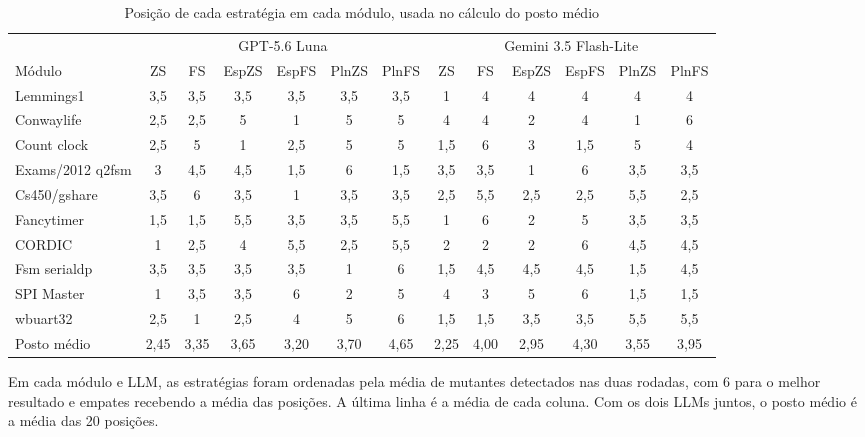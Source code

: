\begin{table}[htbp]
  \centering
  \caption{Posição de cada estratégia em cada módulo, usada no cálculo do posto médio}
  \label{tab:ap_postos}
  \scriptsize
  \setlength{\tabcolsep}{3pt}
  \begin{tabular}{@{}l*{6}{c}@{\hspace{8pt}}*{6}{c}@{}}
    \toprule
     & \multicolumn{6}{c}{GPT-5.6 Luna} & \multicolumn{6}{c}{Gemini 3.5 Flash-Lite} \\
    \cmidrule(r){2-7} \cmidrule(l){8-13}
    Módulo & ZS & FS & EspZS & EspFS & PlnZS & PlnFS & ZS & FS & EspZS & EspFS & PlnZS & PlnFS \\
    \midrule
    Lemmings1 & 3,5 & 3,5 & 3,5 & 3,5 & 3,5 & 3,5 & 1 & 4 & 4 & 4 & 4 & 4 \\
    Conwaylife & 2,5 & 2,5 & 5 & 1 & 5 & 5 & 4 & 4 & 2 & 4 & 1 & 6 \\
    Count clock & 2,5 & 5 & 1 & 2,5 & 5 & 5 & 1,5 & 6 & 3 & 1,5 & 5 & 4 \\
    Exams/2012 q2fsm & 3 & 4,5 & 4,5 & 1,5 & 6 & 1,5 & 3,5 & 3,5 & 1 & 6 & 3,5 & 3,5 \\
    Cs450/gshare & 3,5 & 6 & 3,5 & 1 & 3,5 & 3,5 & 2,5 & 5,5 & 2,5 & 2,5 & 5,5 & 2,5 \\
    Fancytimer & 1,5 & 1,5 & 5,5 & 3,5 & 3,5 & 5,5 & 1 & 6 & 2 & 5 & 3,5 & 3,5 \\
    CORDIC & 1 & 2,5 & 4 & 5,5 & 2,5 & 5,5 & 2 & 2 & 2 & 6 & 4,5 & 4,5 \\
    Fsm serialdp & 3,5 & 3,5 & 3,5 & 3,5 & 1 & 6 & 1,5 & 4,5 & 4,5 & 4,5 & 1,5 & 4,5 \\
    SPI Master & 1 & 3,5 & 3,5 & 6 & 2 & 5 & 4 & 3 & 5 & 6 & 1,5 & 1,5 \\
    wbuart32 & 2,5 & 1 & 2,5 & 4 & 5 & 6 & 1,5 & 1,5 & 3,5 & 3,5 & 5,5 & 5,5 \\
    \midrule
    Posto médio & 2,45 & 3,35 & 3,65 & 3,20 & 3,70 & 4,65 & 2,25 & 4,00 & 2,95 & 4,30 & 3,55 & 3,95 \\
    \bottomrule
  \end{tabular}

  \smallskip
  {\footnotesize Em cada módulo e LLM, as estratégias foram ordenadas pela média de mutantes detectados nas duas rodadas, com 6 para o melhor resultado e empates recebendo a média das posições. A última linha é a média de cada coluna. Com os dois LLMs juntos, o posto médio é a média das 20 posições.}
\end{table}

